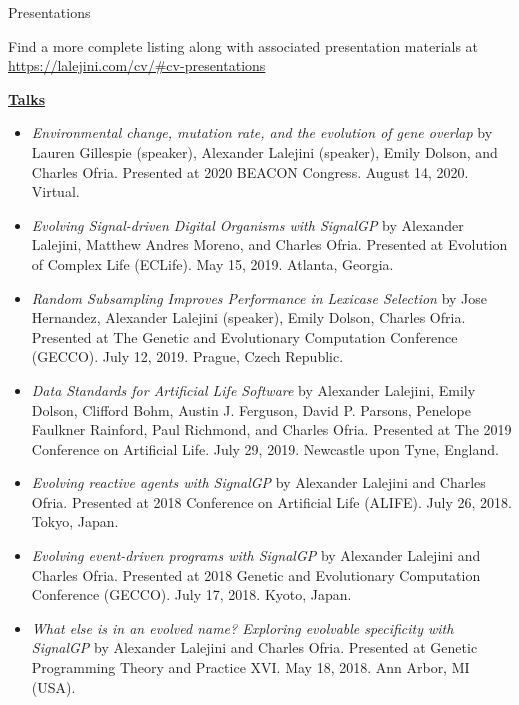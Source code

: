 \begin{rSection}{Presentations}

Find a more complete listing along with associated presentation materials at \url{https://lalejini.com/cv/#cv-presentations}

\underline{\large {\bf Talks}}

\begin{itemize}

\item \textit{Environmental change, mutation rate, and the evolution of gene overlap}
by Lauren Gillespie (speaker), Alexander Lalejini (speaker), Emily Dolson, and Charles Ofria.
Presented at 2020 BEACON Congress. August 14, 2020. Virtual.

\item \textit{Evolving Signal-driven Digital Organisms with SignalGP}
by Alexander Lalejini, Matthew Andres Moreno, and Charles Ofria.
Presented at Evolution of Complex Life (ECLife). May 15, 2019. Atlanta, Georgia.

\item \textit{Random Subsampling Improves Performance in Lexicase Selection}
by Jose Hernandez, Alexander Lalejini (speaker), Emily Dolson, Charles Ofria.
Presented at The Genetic and Evolutionary Computation Conference (GECCO). July 12, 2019. Prague, Czech Republic.

\item \textit{Data Standards for Artificial Life Software}
by Alexander Lalejini, Emily Dolson, Clifford Bohm, Austin J. Ferguson, David P. Parsons, Penelope Faulkner Rainford, Paul Richmond, and Charles Ofria.
Presented at The 2019 Conference on Artificial Life. July 29, 2019. Newcastle upon Tyne, England.

\item \textit{Evolving reactive agents with SignalGP}
by Alexander Lalejini and Charles Ofria.
Presented at 2018 Conference on Artificial Life (ALIFE). July 26, 2018. Tokyo, Japan.

\item \textit{Evolving event-driven programs with SignalGP}
by Alexander Lalejini and Charles Ofria.
Presented at 2018 Genetic and Evolutionary Computation Conference (GECCO). July 17, 2018. Kyoto, Japan.

\item \textit{What else is in an evolved name? Exploring evolvable specificity with SignalGP}
by Alexander Lalejini and Charles Ofria.
Presented at Genetic Programming Theory and Practice XVI. May 18, 2018. Ann Arbor, MI (USA).


\end{itemize}
\end{rSection}
